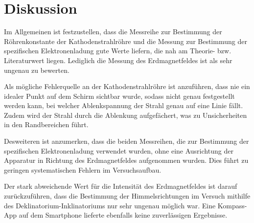 \section{Diskussion}
\label{sec:Diskussion}

Im Allgemeinen ist festzustellen, dass die Messreihe zur Bestimmung der Röhrenkonstante
der Kathodenstrahlröhre und die Messung zur Bestimmung der spezifischen Elektronenladung
gute Werte liefern, die nah am Theorie- bzw. Literaturwert liegen. Lediglich die
Messung des Erdmagnetfeldes ist als sehr ungenau zu bewerten.

Als mögliche Fehlerquelle an der Kathodenstrahlröhre ist anzuführen, dass nie
ein idealer Punkt auf dem Schirm sichtbar wurde, sodass nicht genau festgestellt
werden kann, bei welcher Ablenkspannung der Strahl genau auf eine Linie fällt.
Zudem wird der Strahl durch die Ablenkung aufgefächert, was zu Unsicherheiten
in den Randbereichen führt.

Desweiteren ist anzumerken, dass die beiden Messreihen, die zur Bestimmung der
spezifischen Elektronenladung verwendet wurden, ohne eine Ausrichtung der Apparatur
in Richtung des Erdmagnetfeldes aufgenommen wurden. Dies führt zu geringen
systematischen Fehlern im Versuchsaufbau.

Der stark abweichende Wert für die Intensität des Erdmagnetfeldes ist darauf zurückzuführen,
dass die Bestimmung der Himmelsrichtungen im Versuch mithilfe des Deklinatorium-Inklinatoriums
nur sehr ungenau möglich war. Eine Kompass-App auf dem Smartphone lieferte ebenfalls
keine zuverlässigen Ergebnisse.
